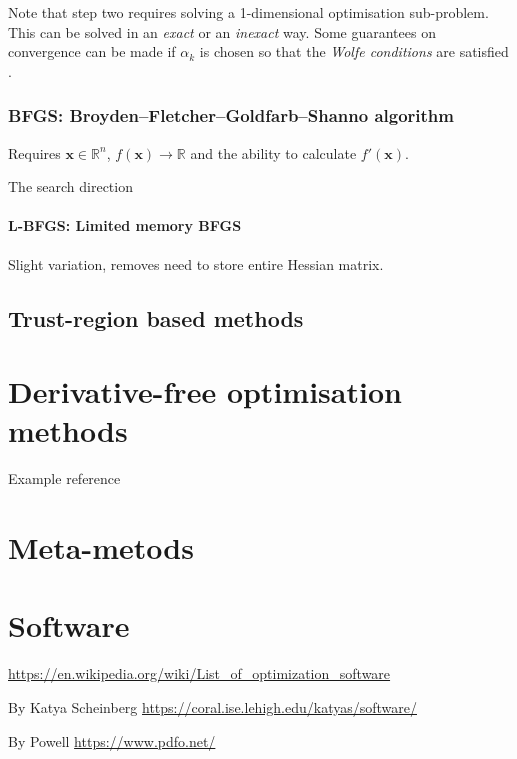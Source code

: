 \documentclass[10pt]{article}
\begin{document}
Note that step two requires solving a 1-dimensional optimisation sub-problem.
This can be solved in an \emph{exact} or an \emph{inexact} way.
Some guarantees on convergence can be made if $\alpha_k$ is chosen so that the \emph{Wolfe conditions} are satisfied \citep{Wolfe1969Conditions1, Wolfe1971Conditions2}.

\subsubsection{BFGS: Broyden–Fletcher–Goldfarb–Shanno algorithm}

Requires $\bm{x} \in \mathbb{R}^n$, $f(\bm{x}) \to \mathbb{R}$ and the ability to calculate  $f'(\bm{x})$.

The search direction


\paragraph{L-BFGS: Limited memory BFGS}

Slight variation, removes need to store entire Hessian matrix.


%
%
\subsection{Trust-region based methods}

%
%
%
%
\section{Derivative-free optimisation methods}

Example reference \citet{Nelder1965NelderMead}


%
%
%
%
\section{Meta-metods}


%
%
%
%
\section{Software}

\url{https://en.wikipedia.org/wiki/List_of_optimization_software}

By Katya Scheinberg \citep{Conn2009DerivativeFreeOpt} \url{https://coral.ise.lehigh.edu/katyas/software/}

By Powell \url{https://www.pdfo.net/}

%
%
%
%


\end{document}
